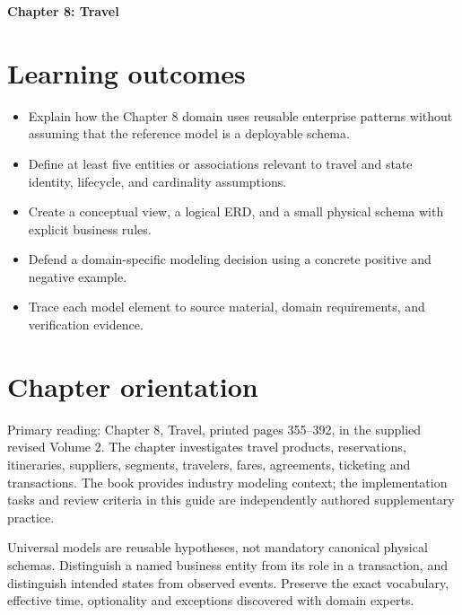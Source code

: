 \documentclass[11pt,letterpaper]{article}
\begin{document}
\begin{center}
{\LARGE\bfseries\color{navy} Chapter 8: Travel}\par
\vspace{0.25em}{\large Study guide | concept, critique, design, verify}\par
{}
\end{center}
\vspace{0.8em}
\section{Learning outcomes}
\begin{itemize}
\item Explain how the Chapter 8 domain uses reusable enterprise patterns without assuming that the reference model is a deployable schema.
\item Define at least five entities or associations relevant to travel and state identity, lifecycle, and cardinality assumptions.
\item Create a conceptual view, a logical ERD, and a small physical schema with explicit business rules.
\item Defend a domain-specific modeling decision using a concrete positive and negative example.
\item Trace each model element to source material, domain requirements, and verification evidence.
\end{itemize}

\section{Chapter orientation}
Primary reading: Chapter 8, Travel, printed pages 355--392, in the supplied revised Volume 2. The chapter investigates travel products, reservations, itineraries, suppliers, segments, travelers, fares, agreements, ticketing and transactions. The book provides industry modeling context; the implementation tasks and review criteria in this guide are independently authored supplementary practice.

Universal models are reusable hypotheses, not mandatory canonical physical schemas. Distinguish a named business entity from its role in a transaction, and distinguish intended states from observed events. Preserve the exact vocabulary, effective time, optionality and exceptions discovered with domain experts.
\end{document}
